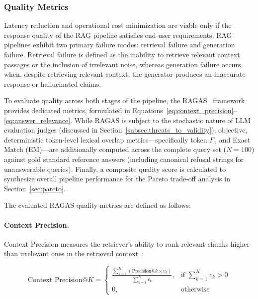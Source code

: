 \subsubsection{Quality Metrics}
\label{sec:quality}

Latency reduction and operational cost minimization are viable only if the response quality of the RAG pipeline satisfies end-user requirements. RAG pipelines exhibit two primary failure modes: retrieval failure and generation failure. Retrieval failure is defined as the inability to retrieve relevant context passages or the inclusion of irrelevant noise, whereas generation failure occurs when, despite retrieving relevant context, the generator produces an inaccurate response or hallucinated claims. 

To evaluate quality across both stages of the pipeline, the RAGAS~\citep{es2024ragas} framework provides dedicated metrics, formulated in Equations~\ref{eq:context_precision}--\ref{eq:answer_relevance}. While RAGAS is subject to the stochastic nature of LLM evaluation judges (discussed in Section~\ref{subsec:threats_to_validity}), objective, deterministic token-level lexical overlap metrics---specifically token $F_1$ and Exact Match (EM)---are additionally computed across the complete query set ($N = 100$) against gold standard reference answers (including canonical refusal strings for unanswerable queries). Finally, a composite quality score is calculated to synthesize overall pipeline performance for the Pareto trade-off analysis in Section~\ref{sec:pareto}.

The evaluated RAGAS quality metrics are defined as follows:

\paragraph{Context Precision.} Context Precision measures the retriever's ability to rank relevant chunks higher than irrelevant ones in the retrieved context~\citep{es2024ragas}:

\begin{equation}
\label{eq:context_precision}
\text{Context Precision}@K = \begin{cases}
\frac{\sum_{k=1}^{K} \left( \text{Precision}@k \times v_k \right)}{\sum_{k=1}^{K} v_k}, & \text{if } \sum_{k=1}^{K} v_k > 0 \\
0, & \text{otherwise}
\end{cases}
\end{equation}

